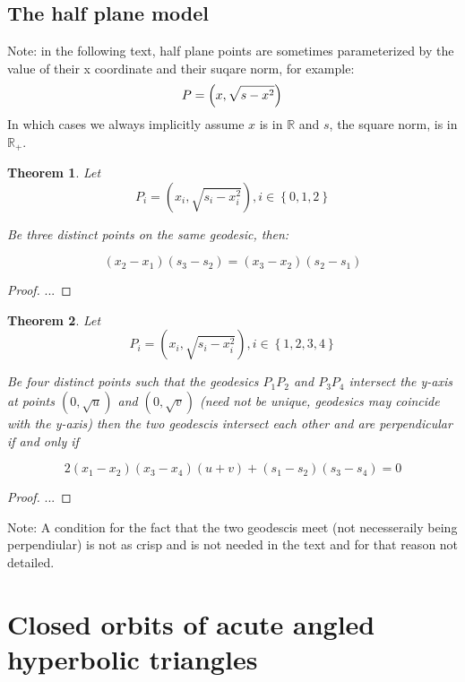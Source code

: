\documentclass[a4paper,10pt]{article}
\newtheorem{theorem}{Theorem}[section]
\begin{document}
\subsection{The half plane model}

Note: in the following text, half plane points are sometimes parameterized by the
value of their x coordinate and their suqare norm, for example:
\[
P = \left(x, \sqrt{s - x^2}\right)\\
\]
In which cases we always implicitly assume $x$ is in $\mathbb{R}$ and $s$, the square norm, is in $\mathbb{R_+}$.

\label{half-plane-concurrent}
\begin{theorem}

Let
\[
P_i = \left(x_i, \sqrt{s_i - x_i^2}\right), i\in\left\{0,1,2\right\}
\]

Be three distinct points on the same geodesic, then:

\[
  \left(x_2 - x_1\right)\left(s_3 - s_2\right) = \left(x_3 - x_2\right)\left(s_2 - s_1\right)
\]
\end{theorem}
\begin{proof}
...
\end{proof}

\label{half-plane-concurrent}
\begin{theorem}

Let
\[
P_i = \left(x_i, \sqrt{s_i - x_i^2}\right), i\in\left\{1,2,3,4\right\}
\]



Be four distinct points such that the geodesics $P_1P_2$ and $P_3P_4$ intersect the y-axis at
points $(0,\sqrt{u})$ and $(0,\sqrt{v})$ (need not be unique, geodesics may coincide with the y-axis)
then the two geodescis intersect each other and are perpendicular if and only if

\[
2\left(x_1 - x_2\right)\left(x_3 - x_4\right)\left(u + v\right) + \left(s_1 - s_2\right)\left(s_3 - s_4\right) = 0
\]

\end{theorem}

\begin{proof}
...
\end{proof}

Note: A condition for the fact that the two geodescis meet (not necesseraily being perpendiular) 
is not as crisp and is not needed in the text and for that reason not detailed.

\section{Closed orbits of acute angled hyperbolic triangles}
\end{document}

